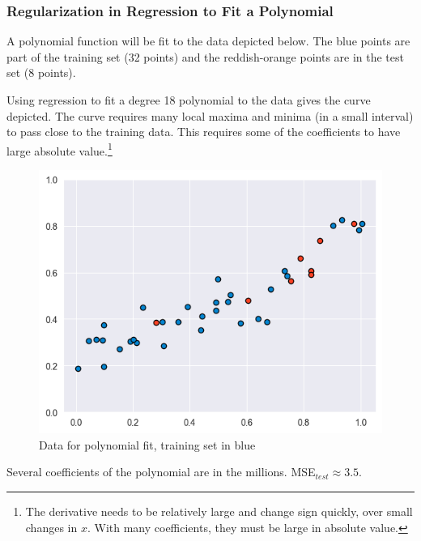 \documentclass[smaller]{beamer}
\theoremstyle{example}
\begin{document}
\begin{frame}
    \frametitle{Regularization in Regression to Fit a Polynomial}
    \renewcommand\thefootnote{\textcolor{white}{\arabic{footnote}}}
    A polynomial function will be fit to the data depicted below. The blue points are part of the training set (32 points) and the reddish-orange points are in the test set (8 points).
    
    {\color{white}Using regression to fit a degree 18 polynomial to the data gives the curve depicted. The curve requires many local maxima and minima (in a small interval) to pass close to the training data. This requires some of the coefficients to have large absolute value.}\footnote{{\color{white}The derivative needs to be relatively large and change sign quickly, over small changes in $x$. With many coefficients, they must be large in absolute value.}}
    
    \begin{figure}
        \begin{center}
            \includegraphics[height=0.30\textheight]{../../Images/data_polynomial_fit.png}
        \end{center}
        \caption{Data for polynomial fit, training set in blue}
    \end{figure}

    {\color{white}Several coefficients of the polynomial are in the millions. MSE$_{test}\approx 3.5$.}
\end{frame}
\end{document}
